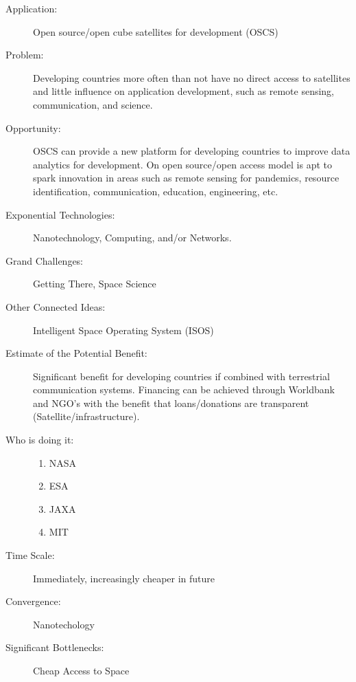 \begin{description}
\item[Application:] Open source/open cube satellites for development (OSCS)

\item[Problem:] Developing countries more often than not have no direct access to satellites and little
influence on application development, such as remote sensing, communication, and science.

\item[Opportunity:] OSCS can provide a new platform for developing countries to improve data
analytics for development. On open source/open access model is apt to spark innovation in areas
such as remote sensing for pandemics, resource identification, communication, education,
engineering, etc.
\cite{cubesatlaunch}

\item[Exponential Technologies:]    Nanotechnology, Computing, and/or
Networks.

\item[Grand Challenges:] Getting There, Space Science

\item[Other Connected Ideas:]   Intelligent Space Operating System (ISOS)

\item[Estimate of the Potential Benefit:]  Significant benefit for developing countries if combined
with terrestrial communication systems. Financing can be achieved through Worldbank and
NGO’s with the benefit that loans/donations are transparent (Satellite/infrastructure).

\item[Who is doing it:]
\hfill\begin{enumerate}
\item NASA
\item ESA
\item JAXA
\item MIT
\end{enumerate}

\item[Time Scale:] Immediately, increasingly cheaper in future

\item[Convergence:] Nanotechology

\item[Significant Bottlenecks:] Cheap Access to Space
\end{description}

